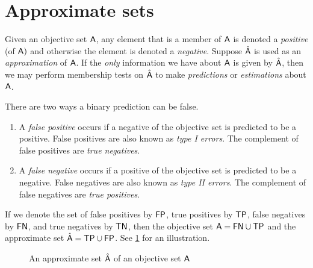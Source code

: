\documentclass[ ../main.tex]{subfiles}
\begin{document}
\section{Approximate sets}
\label{sec:asets}
Given an objective set $\Set{A}$, any element that is a member of $\Set{A}$ is denoted a \emph{positive} (of $\Set{A})$ and otherwise the element is denoted a \emph{negative}.
Suppose $\hat{\Set{A}}$ is used as an \emph{approximation} of $\Set{A}$.
If the \emph{only} information we have about $\Set{A}$ is given by $\hat{\Set{A}}$, then we may perform membership tests on $\hat{\Set{A}}$ to make \emph{predictions} or \emph{estimations} about $\Set{A}$.

There are two ways a binary prediction can be false.
\begin{enumerate}
    \item A \emph{false positive} occurs if a negative of the objective set is predicted to be a positive. False positives are also known as \emph{type I errors}.
    The complement of false positives are \emph{true negatives}.
    \item A \emph{false negative} occurs if a positive of the objective set is predicted to be a negative. False negatives are also known as \emph{type II errors}.
    The complement of false negatives are \emph{true positives}.
\end{enumerate} 

If we denote the set of false positives by $\PlainSet{FP}$, true positives by $\PlainSet{TP}$, false negatives by $\PlainSet{FN}$, and true negatives by $\PlainSet{TN}$, then the objective set $\Set{A}=\SetUnion[\PlainSet{FN}][\Set{TP}]$ and the approximate set $\hat{\Set{A}}=\SetUnion[\PlainSet{TP}][\PlainSet{FP}]$.
See \cref{fig:ex_approx_set} for an illustration.
\begin{figure}[ht]
\caption{An approximate set $\hat{\Set{A}}$ of an objective set $\Set{A}$}
\label{fig:ex_approx_set}
\centering
\def\svgwidth{\columnwidth/4}

\end{figure}
\end{document}
